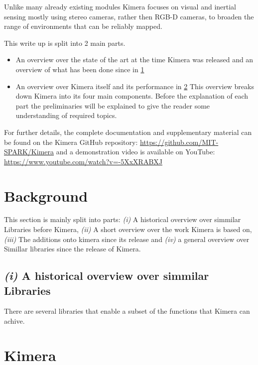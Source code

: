 \documentclass[11pt,a4paper]{article}
\begin{document}
Unlike many already existing modules Kimera focuses on visual and inertial sensing mostly using stereo cameras, rather then RGB-D cameras, to broaden the range of environments that can be reliably mapped. 

This write up is split into 2 main parts. 
\begin{itemize}
    \item An overview over the state of the art at the time Kimera was released and an overview of what has been done since in \ref{Sec:background}
    \item An overview over Kimera itself and its performance in \ref{Sec:kimera}
        This overview breaks down Kimera into its four main components. 
        Before the explanation of each part the preliminaries will be explained to give the reader some understanding of required topics.
\end{itemize}
For further details, the complete documentation and supplementary material can be found on the Kimera GitHub repository: \url{https://github.com/MIT-SPARK/Kimera} and a demonstration video is available on YouTube: \url{https://www.youtube.com/watch?v=-5XxXRABXJ}
\section{Background} \label{Sec:background}
This section is mainly split into parts: \emph{(i)} A historical overview over simmilar Libraries before Kimera, \emph{(ii)} A short overview over the work Kimera is based on, \emph{(iii)} The additions onto kimera since its release and \emph{(iv)} a general overview over Simillar libraries since the release of Kimera.
\subsection*{\emph{(i)} A historical overview over simmilar Libraries}
There are several libraries that enable a subset of the functions that Kimera can achive. 
 
\section{Kimera} \label{Sec:kimera}
\end{document}
